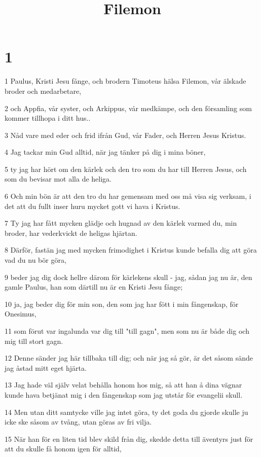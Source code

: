 

\title{Filemon}


\chapter{1}

\par 1 Paulus, Kristi Jesu fånge, och brodern Timoteus hälsa Filemon, vår älskade broder och medarbetare,
\par 2 och Appfia, vår syster, och Arkippus, vår medkämpe, och den församling som kommer tillhopa i ditt hus..
\par 3 Nåd vare med eder och frid ifrån Gud, vår Fader, och Herren Jesus Kristus.
\par 4 Jag tackar min Gud alltid, när jag tänker på dig i mina böner,
\par 5 ty jag har hört om den kärlek och den tro som du har till Herren Jesus, och som du bevisar mot alla de heliga.
\par 6 Och min bön är att den tro du har gemensam med oss må visa sig verksam, i det att du fullt inser huru mycket gott vi hava i Kristus.
\par 7 Ty jag har fått mycken glädje och hugnad av den kärlek varmed du, min broder, har vederkvickt de heligas hjärtan.
\par 8 Därför, fastän jag med mycken frimodighet i Kristus kunde befalla dig att göra vad du nu bör göra,
\par 9 beder jag dig dock hellre därom för kärlekens skull - jag, sådan jag nu är, den gamle Paulus, han som därtill nu är en Kristi Jesu fånge;
\par 10 ja, jag beder dig för min son, den som jag har fött i min fångenskap, för Onesimus,
\par 11 som förut var ingalunda var dig till "till gagn", men som nu är både dig och mig till stort gagn.
\par 12 Denne sänder jag här tillbaka till dig; och när jag så gör, är det såsom sände jag åstad mitt eget hjärta.
\par 13 Jag hade väl själv velat behålla honom hos mig, så att han å dina vägnar kunde hava betjänat mig i den fångenskap som jag utstår för evangelii skull.
\par 14 Men utan ditt samtycke ville jag intet göra, ty det goda du gjorde skulle ju icke ske såsom av tvång, utan göras av fri vilja.
\par 15 När han för en liten tid blev skild från dig, skedde detta till äventyrs just för att du skulle få honom igen för alltid,
